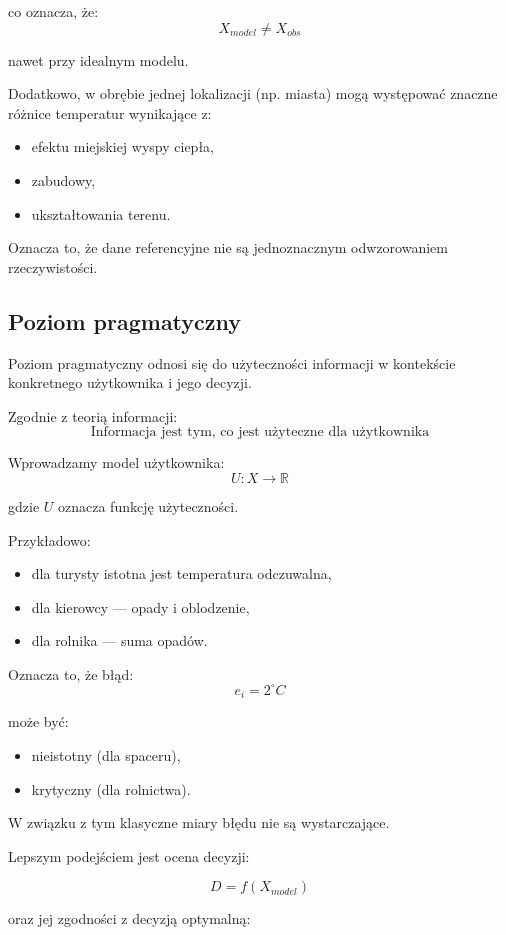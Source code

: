 \documentclass[a4paper,12pt]{article}
\begin{document}
co oznacza, że:
\[
X_{model} \neq X_{obs}
\]

nawet przy idealnym modelu.

Dodatkowo, w obrębie jednej lokalizacji (np. miasta) mogą występować
znaczne różnice temperatur wynikające z:
\begin{itemize}
    \item efektu miejskiej wyspy ciepła,
    \item zabudowy,
    \item ukształtowania terenu.
\end{itemize}

Oznacza to, że dane referencyjne nie są jednoznacznym odwzorowaniem rzeczywistości.

\subsection{Poziom pragmatyczny}

Poziom pragmatyczny odnosi się do użyteczności informacji w kontekście
konkretnego użytkownika i jego decyzji.

Zgodnie z teorią informacji:
\[
\text{Informacja jest tym, co jest użyteczne dla użytkownika}
\]

Wprowadzamy model użytkownika:
\[
U : X \rightarrow \mathbb{R}
\]

gdzie $U$ oznacza funkcję użyteczności.

Przykładowo:
\begin{itemize}
    \item dla turysty istotna jest temperatura odczuwalna,
    \item dla kierowcy — opady i oblodzenie,
    \item dla rolnika — suma opadów.
\end{itemize}

Oznacza to, że błąd:
\[
e_i = 2^\circ C
\]

może być:
\begin{itemize}
    \item nieistotny (dla spaceru),
    \item krytyczny (dla rolnictwa).
\end{itemize}

W związku z tym klasyczne miary błędu nie są wystarczające.

Lepszym podejściem jest ocena decyzji:

\[
D = f(X_{model})
\]

oraz jej zgodności z decyzją optymalną:
\end{document}

